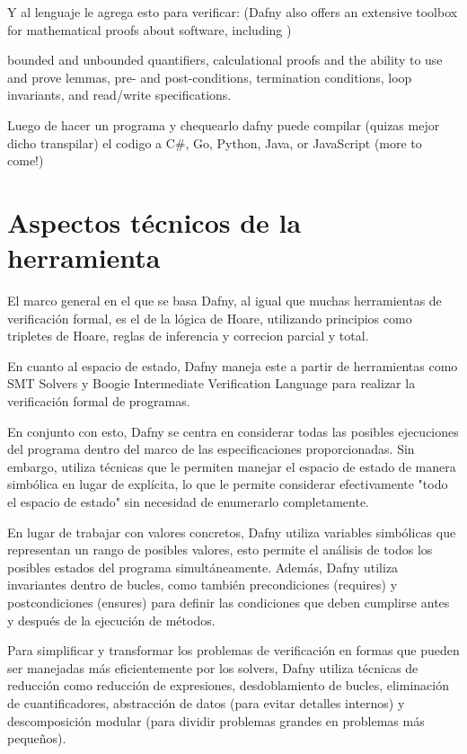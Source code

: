 \documentclass[runningheads]{llncs}
\begin{document}
Y al lenguaje le agrega esto para verificar: (Dafny also offers an extensive toolbox for mathematical proofs about software, including
)

bounded and unbounded quantifiers,
calculational proofs and the ability to use and prove lemmas,
pre- and post-conditions, termination conditions, loop invariants, and read/write specifications.

Luego de hacer un programa y chequearlo dafny puede compilar (quizas mejor dicho transpilar) el codigo a C\#, Go, Python, Java, or JavaScript (more to come!)

\section{Aspectos técnicos de la herramienta}
El marco general en el que se basa Dafny, al igual que muchas herramientas de verificación formal, es el de la lógica de Hoare,
utilizando principios como tripletes de Hoare, reglas de inferencia y correcion parcial y total.

En cuanto al espacio de estado, Dafny maneja este a partir de herramientas como SMT Solvers y Boogie Intermediate Verification Language
para realizar la verificación formal de programas.

En conjunto con esto, Dafny se centra en considerar todas las posibles ejecuciones del programa dentro del marco de las especificaciones proporcionadas. 
Sin embargo, utiliza técnicas que le permiten manejar el espacio de estado de manera simbólica en lugar de explícita, 
lo que le permite considerar efectivamente "todo el espacio de estado" sin necesidad de enumerarlo completamente.

En lugar de trabajar con valores concretos, Dafny utiliza variables simbólicas que representan un rango de posibles valores,
esto permite el análisis de todos los posibles estados del programa simultáneamente.
Además, Dafny utiliza invariantes dentro de bucles, como también precondiciones (requires) y postcondiciones (ensures) para definir las condiciones 
que deben cumplirse antes y después de la ejecución de métodos.

Para simplificar y transformar los problemas de verificación en formas que pueden ser manejadas más eficientemente por los solvers, 
Dafny utiliza técnicas de reducción como reducción de expresiones, desdoblamiento de bucles, eliminación de cuantificadores,
abstracción de datos (para evitar detalles internos) y descomposición modular (para dividir problemas grandes en problemas más pequeños).
\end{document}
